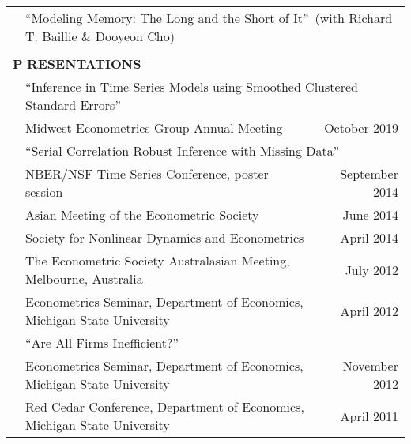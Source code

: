 \documentclass[10pt]{article}
\begin{document}
\begin{center}
\begin{tabular}{llllr}
& \multicolumn{4}{l}{\textquotedblleft Modeling Memory: The Long and the Short of It\textquotedblright \ (with Richard T. Baillie \& Dooyeon Cho)} \vspace{0.1cm}\\
\multicolumn{5}{p{500pt}}{}\\
\multicolumn{5}{l}{{\Large \textbf{P}}
\textbf{RESENTATIONS}}\vspace{0.1cm}\\
&\multicolumn{4}{l}{\textquotedblleft Inference in Time Series Models using Smoothed Clustered Standard Errors\textquotedblright } \\
\multicolumn{1}{l}{} &  \multicolumn{3}{l}{
Midwest Econometrics Group Annual Meeting} &\multicolumn{1}{r}{October 2019}\vspace{0.2cm}\\
&\multicolumn{4}{l}{\textquotedblleft Serial Correlation
Robust Inference with Missing Data\textquotedblright } \\
\multicolumn{1}{l}{} &  \multicolumn{3}{l}{
NBER/NSF Time Series Conference, poster session} &\multicolumn{1}{r}{September 2014}\\
\multicolumn{1}{l}{} & \multicolumn{3}{l}{
Asian Meeting of the Econometric Society} &\multicolumn{1}{r}{June 2014}\\
\multicolumn{1}{l}{} &\multicolumn{3}{l}{
Society for Nonlinear Dynamics and Econometrics} &\multicolumn{1}{r}{April 2014}\\
\multicolumn{1}{l}{} & \multicolumn{3}{l}{
The Econometric Society Australasian Meeting, Melbourne, Australia} &\multicolumn{1}{r}{July 2012}\\
\multicolumn{1}{l}{} &\multicolumn{3}{l}{
Econometrics Seminar, Department of Economics, Michigan State University} &\multicolumn{1}{r}{April 2012}\vspace{0.2cm}\\
& \multicolumn{4}{l}{ \textquotedblleft Are All Firms Inefficient?\textquotedblright}\\
\multicolumn{1}{l}{} & \multicolumn{3}{l}{
Econometrics Seminar, Department of Economics, Michigan State University} &\multicolumn{1}{r}{November 2012}\\
\multicolumn{1}{l}{} & \multicolumn{3}{l}{
Red Cedar Conference, Department of Economics, Michigan State University} &\multicolumn{1}{r}{April 2011} \\
\end{tabular}

\clearpage


\end{center}
\end{document}
